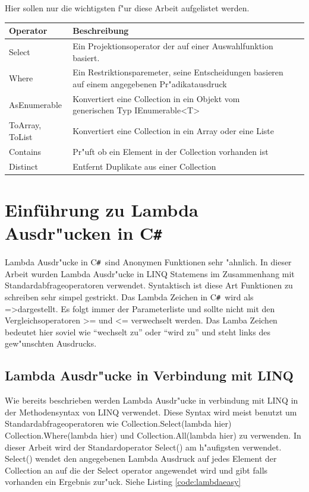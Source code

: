 \documentclass[pagesize, paper=a4, fontsize=12pt,titlepage=true, headings=small, headnosepline, abstractoff, liststotoc, nochapterprefix, plainheadsepline]{scrreprt}
\newcommand{\CS}{C\texttt{\#}}
\newcommand{\CSS}{C\texttt{\# }}
\newcommand{\LAM}{ =\textgreater\space}
\begin{document}
Hier sollen nur die wichtigsten f"ur diese Arbeit aufgelistet werden.

\label{tab:standardoperatoren}
\begin{tabular}{p{3cm}|p{9cm} |l|l|}
\hline
  Operator & Beschreibung\\
\hline
\hline
  Select & Ein Projektionsoperator der auf einer Auswahlfunktion basiert.\\
\hline
  Where & Ein Restriktionsparemeter, seine Entscheidungen basieren auf einem angegebenen
 Pr"adikatausdruck\\
\hline
AsEnumerable & Konvertiert eine Collection in ein Objekt vom generischen Typ IEnumerable<T>\\
\hline
ToArray, ToList & Konvertiert eine Collection in ein Array oder eine Liste\\
\hline
Contains & Pr"uft ob ein Element in der Collection vorhanden ist\\
\hline
Distinct & Entfernt Duplikate aus einer Collection \\
\hline
\end{tabular}

\newpage
	\section {Einführung zu Lambda Ausdr"ucken in \CS}
		Lambda Ausdr"ucke in \CSS sind Anonymen Funktionen sehr "ahnlich. In dieser Arbeit wurden Lambda Ausdr"ucke in LINQ Statemens im Zusammenhang mit Standardabfrageoperatoren verwendet. Syntaktisch ist diese Art Funktionen zu schreiben sehr simpel gestrickt. Das Lambda Zeichen in \CSS wird als \LAM dargestellt. Es folgt immer der Parameterliste und sollte nicht mit den Vergleichsoperatoren \textgreater = und \textless = verwechselt werden. Das Lamba Zeichen bedeutet hier soviel wie "`wechselt zu"' oder "`wird zu"' und steht links des gew"unschten Ausdrucks.
		\subsection {Lambda Ausdr"ucke in Verbindung mit LINQ}
Wie bereits beschrieben werden Lambda Ausdr"ucke  in verbindung mit LINQ in der Methodensyntax von LINQ verwendet. Diese Syntax wird meist benutzt um Standardabfrageoperatoren wie Collection.Select(lambda hier) Collection.Where(lambda hier) und Collection.All(lambda hier) zu verwenden. In dieser Arbeit wird der Standardoperator Select() am h"aufigsten verwendet. Select() wendet den angegebenen Lambda Ausdruck auf jedes Element der Collection an auf die der Select operator angewendet wird und gibt falls vorhanden ein Ergebnis zur"uck. Siehe Listing \ref{code:lambdaeasy}
\end{document}
